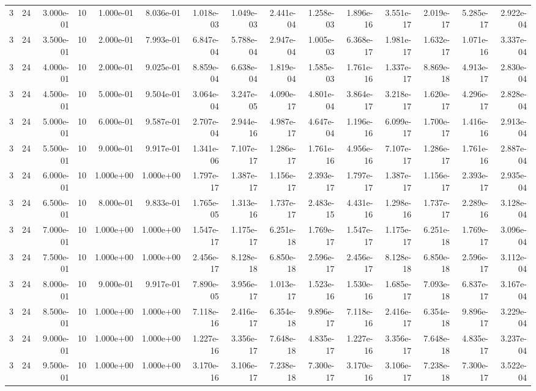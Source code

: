 \begin{tabular}{rrrrrrrrrrrrrrr}
3 & 24 & 3.000e-01 & 10 & 1.000e-01 & 8.036e-01 & 1.018e-03 & 1.049e-03 & 2.441e-04 & 1.258e-03 & 1.896e-16 & 3.551e-17 & 2.019e-17 & 5.285e-17 & 2.922e-04 \\
3 & 24 & 3.500e-01 & 10 & 2.000e-01 & 7.993e-01 & 6.847e-04 & 5.788e-04 & 2.947e-04 & 1.005e-03 & 6.368e-17 & 1.981e-17 & 1.632e-17 & 1.071e-16 & 3.337e-04 \\
3 & 24 & 4.000e-01 & 10 & 2.000e-01 & 9.025e-01 & 8.859e-04 & 6.638e-04 & 1.819e-04 & 1.585e-03 & 1.761e-16 & 1.337e-17 & 8.869e-18 & 4.913e-17 & 2.830e-04 \\
3 & 24 & 4.500e-01 & 10 & 5.000e-01 & 9.504e-01 & 3.064e-04 & 3.247e-05 & 4.090e-17 & 4.801e-04 & 3.864e-17 & 3.218e-17 & 1.620e-17 & 4.296e-17 & 2.828e-04 \\
3 & 24 & 5.000e-01 & 10 & 6.000e-01 & 9.587e-01 & 2.707e-04 & 2.944e-16 & 4.987e-17 & 4.647e-04 & 1.196e-16 & 6.099e-17 & 1.700e-17 & 1.416e-16 & 2.913e-04 \\
3 & 24 & 5.500e-01 & 10 & 9.000e-01 & 9.917e-01 & 1.341e-06 & 7.107e-17 & 1.286e-17 & 1.761e-16 & 4.956e-16 & 7.107e-17 & 1.286e-17 & 1.761e-16 & 2.887e-04 \\
3 & 24 & 6.000e-01 & 10 & 1.000e+00 & 1.000e+00 & 1.797e-17 & 1.387e-17 & 1.156e-17 & 2.393e-17 & 1.797e-17 & 1.387e-17 & 1.156e-17 & 2.393e-17 & 2.935e-04 \\
3 & 24 & 6.500e-01 & 10 & 8.000e-01 & 9.833e-01 & 1.765e-05 & 1.313e-16 & 1.737e-17 & 2.483e-15 & 4.431e-16 & 1.298e-16 & 1.737e-17 & 2.289e-16 & 3.128e-04 \\
3 & 24 & 7.000e-01 & 10 & 1.000e+00 & 1.000e+00 & 1.547e-17 & 1.175e-17 & 6.251e-18 & 1.769e-17 & 1.547e-17 & 1.175e-17 & 6.251e-18 & 1.769e-17 & 3.096e-04 \\
3 & 24 & 7.500e-01 & 10 & 1.000e+00 & 1.000e+00 & 2.456e-17 & 8.128e-18 & 6.850e-18 & 2.596e-17 & 2.456e-17 & 8.128e-18 & 6.850e-18 & 2.596e-17 & 3.112e-04 \\
3 & 24 & 8.000e-01 & 10 & 9.000e-01 & 9.917e-01 & 7.890e-05 & 3.956e-17 & 1.013e-17 & 1.523e-16 & 1.530e-16 & 1.685e-17 & 7.093e-18 & 6.837e-17 & 3.167e-04 \\
3 & 24 & 8.500e-01 & 10 & 1.000e+00 & 1.000e+00 & 7.118e-16 & 2.416e-17 & 6.354e-18 & 9.896e-17 & 7.118e-16 & 2.416e-17 & 6.354e-18 & 9.896e-17 & 3.229e-04 \\
3 & 24 & 9.000e-01 & 10 & 1.000e+00 & 1.000e+00 & 1.227e-16 & 3.356e-17 & 7.648e-18 & 4.835e-17 & 1.227e-16 & 3.356e-17 & 7.648e-18 & 4.835e-17 & 3.237e-04 \\
3 & 24 & 9.500e-01 & 10 & 1.000e+00 & 1.000e+00 & 3.170e-16 & 3.106e-17 & 7.238e-18 & 7.300e-17 & 3.170e-16 & 3.106e-17 & 7.238e-18 & 7.300e-17 & 3.522e-04 \\

\end{tabular}
